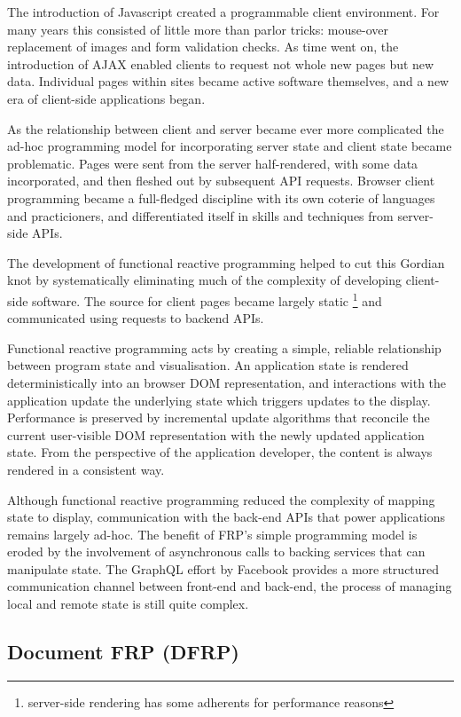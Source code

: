 \documentclass[sigplan,10pt]{acmart}
\begin{document}
The introduction of Javascript created a programmable client environment. For many years this consisted of little more than parlor tricks: mouse-over replacement of images and form validation checks. As time went on, the introduction of AJAX enabled clients to request not whole new pages but new data. Individual pages within sites became active software themselves, and a new era of client-side applications began.

As the relationship between client and server became ever more complicated the ad-hoc programming model for incorporating server state and client state became problematic. Pages were sent from the server half-rendered, with some data incorporated, and then fleshed out by subsequent API requests. Browser client programming became a full-fledged discipline with its own coterie of languages and practicioners, and differentiated itself in skills and techniques from server-side APIs.

The development of functional reactive programming helped to cut this Gordian knot by systematically eliminating much of the complexity of developing client-side software. The source for client pages became largely static \footnote{server-side rendering has some adherents for performance reasons} and communicated using requests to backend APIs.

Functional reactive programming acts by creating a simple, reliable relationship between program state and visualisation. An application state is rendered deterministically into an browser DOM representation, and interactions with the application update the underlying state which triggers updates to the display. Performance is preserved by incremental update algorithms that reconcile the current user-visible DOM representation with the newly updated application state. From the perspective of the application developer, the content is always rendered in a consistent way.

Although functional reactive programming reduced the complexity of mapping state to display, communication with the back-end APIs that power applications remains largely ad-hoc. The benefit of FRP's simple programming model is eroded by the involvement of asynchronous calls to backing services that can manipulate state. The GraphQL effort by Facebook provides a more structured communication channel between front-end and back-end, the process of managing local and remote state is still quite complex.

\subsection{Document FRP (DFRP)}
\end{document}
